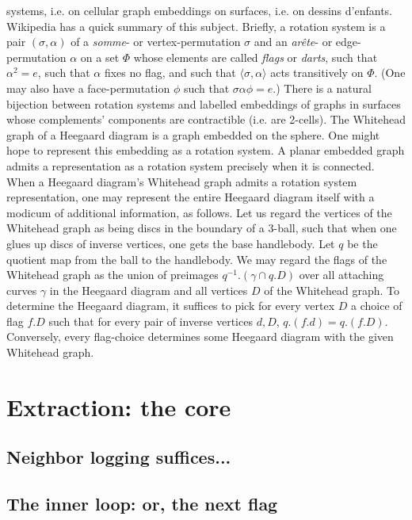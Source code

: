 \documentclass{article}%
\theoremstyle{plain}
\theoremstyle{plain}
\theoremstyle{definition}
\numberwithin{equation}{section}
\begin{document}
systems, i.e. on cellular graph embeddings on surfaces, i.e.
on dessins d'enfants. Wikipedia has a quick summary of this subject.
\nwenddocs{}\nwdocspar
Briefly, a rotation system is a pair $(\sigma, \alpha)$ of a
\emph{somme}- or vertex-permutation $\sigma$ and an \emph{ar\^{e}te}-
or edge-permutation $\alpha$ on a set $\Phi$ whose elements are called
\emph{flags} or \emph{darts}, such that $\alpha^2 = e$,
such that $\alpha$ fixes no flag, and such that $\langle \sigma, \alpha \rangle$
acts transitively on $\Phi$. (One may also have a face-permutation $\phi$
such that $\sigma \alpha \phi = e$.)
\nwenddocs{}\nwdocspar
There is a natural bijection between rotation systems and labelled embeddings
of graphs in surfaces whose complements' components are contractible (i.e. are 2-cells).
\nwenddocs{}\nwdocspar
The Whitehead graph of a Heegaard diagram is a graph embedded on the sphere.
One might hope to represent this embedding as a rotation system.
A planar embedded graph admits a representation as a rotation system precisely
when it is connected.
\nwenddocs{}\nwdocspar
When a Heegaard diagram's Whitehead graph admits a rotation system representation,
one may represent the entire Heegaard diagram itself with a modicum of
additional information, as follows. Let us regard the vertices of the Whitehead
graph as being discs in the boundary of a 3-ball, such that when one glues
up discs of inverse vertices, one gets the base handlebody. Let $q$ be the
quotient map from the ball to the handlebody. 
We may regard the flags of the Whitehead graph as the union of
preimages $q^{-1}.(\gamma \cap q.D)$ over all attaching curves $\gamma$
in the Heegaard diagram and all vertices $D$ of the Whitehead graph.
To determine the Heegaard diagram, it suffices to pick for every vertex $D$ a choice of flag
$f.D$ such that for every pair of inverse vertices $d,D$, $q.(f.d) = q.(f.D)$.
\nwenddocs{}\nwdocspar
Conversely, every flag-choice determines some Heegaard diagram with the given
Whitehead graph.
\nwenddocs{}\nwdocspar

\nwenddocs{}\nwdocspar
\section{Extraction: the core}
\subsection{Neighbor logging suffices...}
\subsection{The inner loop: or, the next flag}
\end{document}

